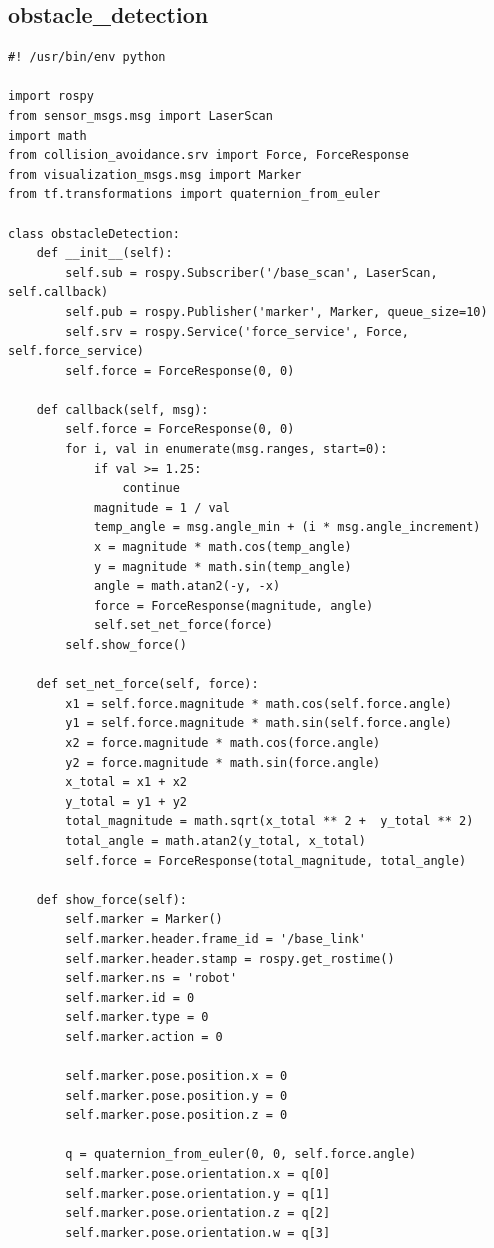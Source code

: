 \documentclass[Lau, binding=0.6cm, oneside]{sapthesis}
\begin{document}
\subsection{obstacle\_detection}
\begin{lstlisting}
#! /usr/bin/env python

import rospy
from sensor_msgs.msg import LaserScan
import math
from collision_avoidance.srv import Force, ForceResponse
from visualization_msgs.msg import Marker
from tf.transformations import quaternion_from_euler

class obstacleDetection:
    def __init__(self):
        self.sub = rospy.Subscriber('/base_scan', LaserScan, self.callback)
        self.pub = rospy.Publisher('marker', Marker, queue_size=10)
        self.srv = rospy.Service('force_service', Force, self.force_service)
        self.force = ForceResponse(0, 0)

    def callback(self, msg):
        self.force = ForceResponse(0, 0)
        for i, val in enumerate(msg.ranges, start=0):
            if val >= 1.25:
                continue
            magnitude = 1 / val
            temp_angle = msg.angle_min + (i * msg.angle_increment)
            x = magnitude * math.cos(temp_angle)
            y = magnitude * math.sin(temp_angle)
            angle = math.atan2(-y, -x)
            force = ForceResponse(magnitude, angle)
            self.set_net_force(force)
        self.show_force()
    
    def set_net_force(self, force):
        x1 = self.force.magnitude * math.cos(self.force.angle)
        y1 = self.force.magnitude * math.sin(self.force.angle)
        x2 = force.magnitude * math.cos(force.angle)
        y2 = force.magnitude * math.sin(force.angle)
        x_total = x1 + x2
        y_total = y1 + y2
        total_magnitude = math.sqrt(x_total ** 2 +  y_total ** 2)
        total_angle = math.atan2(y_total, x_total)
        self.force = ForceResponse(total_magnitude, total_angle)

    def show_force(self):
        self.marker = Marker()
        self.marker.header.frame_id = '/base_link'
        self.marker.header.stamp = rospy.get_rostime()
        self.marker.ns = 'robot'
        self.marker.id = 0
        self.marker.type = 0
        self.marker.action = 0

        self.marker.pose.position.x = 0
        self.marker.pose.position.y = 0
        self.marker.pose.position.z = 0

        q = quaternion_from_euler(0, 0, self.force.angle)
        self.marker.pose.orientation.x = q[0]
        self.marker.pose.orientation.y = q[1]
        self.marker.pose.orientation.z = q[2]
        self.marker.pose.orientation.w = q[3]


\end{lstlisting}
\end{document}
